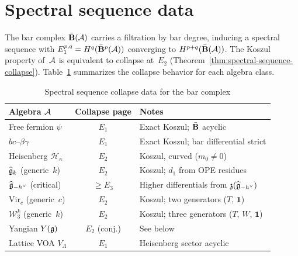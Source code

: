 \section*{Spectral sequence data}
\label{sec:spectral-sequence-data}

The bar complex $\bar{\mathbf{B}}(\mathcal{A})$ carries a filtration by bar degree,
inducing a spectral sequence with
$E_1^{p,q} = H^q(\bar{\mathbf{B}}^p(\mathcal{A}))$
converging to $H^{p+q}(\bar{\mathbf{B}}(\mathcal{A}))$.
The Koszul property of~$\mathcal{A}$ is equivalent to collapse at~$E_2$
(Theorem~\ref{thm:spectral-sequence-collapse}).
Table~\ref{tab:spectral-data} summarizes the collapse behavior
for each algebra class.

\begin{table}[ht]
\centering
\caption{Spectral sequence collapse data for the bar complex}
\label{tab:spectral-data}
\renewcommand{\arraystretch}{1.4}
{\small
\begin{tabular}{|l|c|l|}
\hline
\textbf{Algebra $\mathcal{A}$}
  & \textbf{Collapse page}
  & \textbf{Notes} \\
\hline
Free fermion $\psi$
  & $E_1$
  & Exact Koszul; $\bar{\mathbf{B}}$ acyclic \\
\hline
$bc$--$\beta\gamma$
  & $E_1$
  & Exact Koszul; bar differential strict \\
\hline
Heisenberg $\mathcal{H}_\kappa$
  & $E_2$
  & Koszul, curved ($m_0 \ne 0$) \\
\hline
$\widehat{\mathfrak{g}}_k$ (generic~$k$)
  & $E_2$
  & Koszul; $d_1$ from OPE residues \\
\hline
$\widehat{\mathfrak{g}}_{-h^\vee}$ (critical)
  & $\ge E_3$
  & Higher differentials from $\mathfrak{z}(\widehat{\mathfrak{g}}_{-h^\vee})$ \\
\hline
$\mathrm{Vir}_c$ (generic~$c$)
  & $E_2$
  & Koszul; two generators ($T$, $\mathbf{1}$) \\
\hline
$\mathcal{W}_3^k$ (generic~$k$)
  & $E_2$
  & Koszul; three generators ($T$, $W$, $\mathbf{1}$) \\
\hline
Yangian $Y(\mathfrak{g})$
  & $E_2$ (conj.)
  & See below \\
\hline
Lattice VOA $V_\Lambda$
  & $E_1$
  & Heisenberg sector acyclic \\
\hline
\end{tabular}
}
\end{table}

